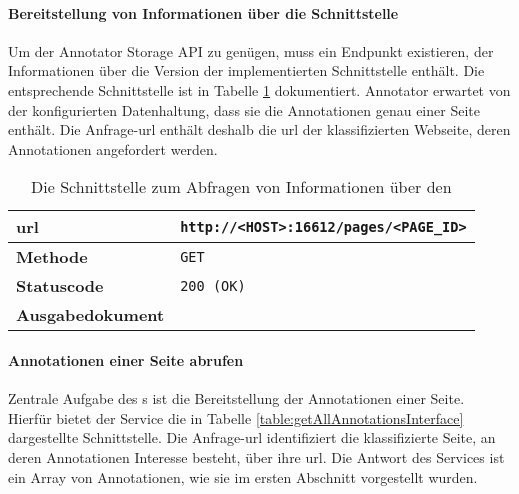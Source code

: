     \paragraph*{Bereitstellung von Informationen über die Schnittstelle}
    Um der Annotator Storage API \cite[Kapitel "`Storage"']{annotator:documentation} zu genügen,
    muss ein Endpunkt existieren,
    der Informationen über die Version der implementierten Schnittstelle
    enthält.
    Die entsprechende Schnittstelle ist in Tabelle
    \ref{table:annotationServiceMetaInterface} dokumentiert.
    Annotator erwartet von der konfigurierten Datenhaltung,
    dass sie die Annotationen genau einer Seite enthält.
    Die Anfrage-\gls{url} enthält deshalb die \gls{url} der klassifizierten Webseite,
    deren Annotationen angefordert werden.

    \begin{table}[htb]
        \centering
        \begin{tabular}{|l|l|}
            \hline
            \textbf{\gls{url}} & \texttt{http://<HOST>:16612/pages/<PAGE\_ID>}\\
            \hline
            \textbf{Methode} & \texttt{GET}\\
            \hline
            \textbf{Statuscode} & \texttt{200 (OK)}\\
            \hline
            \textbf{Ausgabedokument} & \\
            \hline
        \end{tabular}
        \caption{Die Schnittstelle zum Abfragen von Informationen über den {\annotationService}}
        \label{table:annotationServiceMetaInterface}
    \end{table}

    \paragraph*{Annotationen einer Seite abrufen}
    Zentrale Aufgabe des {\annotationService}s ist die Bereitstellung der Annotationen einer Seite.
    Hierfür bietet der Service die in Tabelle \ref{table:getAllAnnotationsInterface}
    dargestellte Schnittstelle.
    Die Anfrage-\gls{url} identifiziert die klassifizierte Seite,
    an deren Annotationen Interesse besteht,
    über ihre \gls{url}.
    Die Antwort des Services ist ein Array von Annotationen, wie sie im ersten Abschnitt vorgestellt wurden.

